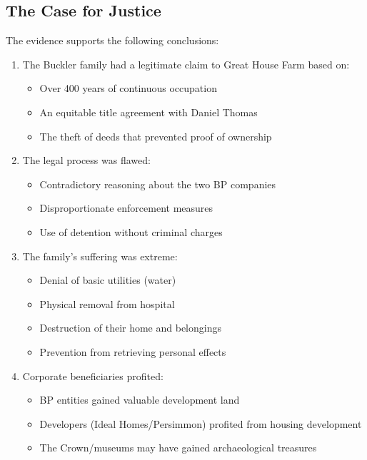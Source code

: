 \documentclass[11pt,a4paper]{article}
\begin{document}
\subsection{The Case for Justice}

The evidence supports the following conclusions:

\begin{enumerate}[label=\arabic*.]
    \item The Buckler family had a legitimate claim to Great House Farm based on:
    \begin{itemize}
        \item Over 400 years of continuous occupation
        \item An equitable title agreement with Daniel Thomas
        \item The theft of deeds that prevented proof of ownership
    \end{itemize}
    
    \item The legal process was flawed:
    \begin{itemize}
        \item Contradictory reasoning about the two BP companies
        \item Disproportionate enforcement measures
        \item Use of detention without criminal charges
    \end{itemize}
    
    \item The family's suffering was extreme:
    \begin{itemize}
        \item Denial of basic utilities (water)
        \item Physical removal from hospital
        \item Destruction of their home and belongings
        \item Prevention from retrieving personal effects
    \end{itemize}
    
    \item Corporate beneficiaries profited:
    \begin{itemize}
        \item BP entities gained valuable development land
        \item Developers (Ideal Homes/Persimmon) profited from housing development
        \item The Crown/museums may have gained archaeological treasures
    \end{itemize}
\end{enumerate}
\end{document}

